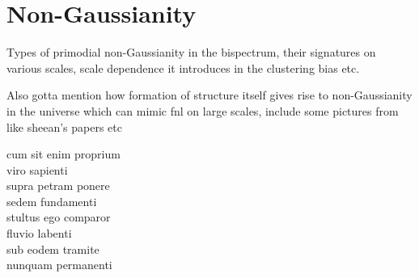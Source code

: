 \section{Non-Gaussianity}

Types of primodial non-Gaussianity in the bispectrum, their signatures on various scales, scale dependence it introduces in the clustering bias etc. 

Also gotta mention how formation of structure itself gives rise to non-Gaussianity in the universe which can mimic fnl on large scales, include some pictures from like sheean's papers etc


cum sit enim proprium \\
viro sapienti \\
supra petram ponere \\
sedem fundamenti \\
stultus ego comparor \\
fluvio labenti \\
sub eodem tramite \\
nunquam permanenti 